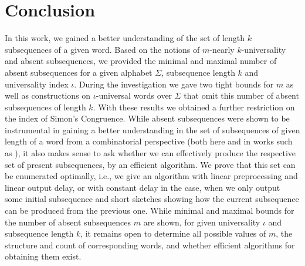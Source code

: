 \documentclass[runningheads,UKenglish,cleveref, autoref, thm-restate]{llncs}
\begin{document}
	\section{Conclusion}
In this work, we gained a better understanding of the set of length $k$ subsequences of a given word. Based on the notions of $m$-nearly $k$-universality and absent subsequences, 
we provided the minimal and maximal number of 
absent subsequences for a given alphabet $\Sigma$, subsequence length $k$ and universality index $\iota$. During the investigation we gave two tight bounds for $m$ as well as 
constructions on $\iota$-universal words over $\Sigma$ that omit 
this number of absent subsequences of length $k$. With these 
results we obtained a further restriction on the index of Simon's Congruence. 
While absent subsequences were shown to be instrumental in gaining a better understanding in the set of subsequences of given length of a word from a combinatorial perspective (both here and in works such as \cite{DBLP:journals/fuin/KoscheKMS22,DBLP:journals/tcs/FleischmannHHHMN23}), it also makes sense to ask whether we can effectively produce the respective set of present subsequences, by an efficient algorithm. We prove that this set can be enumerated optimally, i.e., we give an algorithm with linear preprocessing and linear output delay, or with constant delay in the case, when we only output some initial subsequence and short sketches showing how the current subsequence can be produced from the previous one.
While minimal and maximal bounds for the number of absent subsequences $m$ are shown, for given universality $\iota$ and subsequence length $k$, it remains open to determine all possible values of $m$, the structure and count of corresponding words, and whether efficient algorithms for obtaining them exist.



	
	
	
\end{document}
